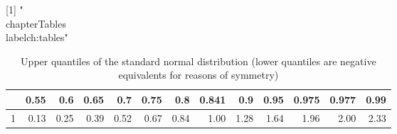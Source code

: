 [1] "\\chapter{Tables}\\label{ch:tables}"
\begin{table}[ht]
\centering
\begin{tabular}{rrrrrrrrrrrrr}
  \hline
 & 0.55 & 0.6 & 0.65 & 0.7 & 0.75 & 0.8 & 0.841 & 0.9 & 0.95 & 0.975 & 0.977 & 0.99 \\ 
  \hline
  1 & 0.13 & 0.25 & 0.39 & 0.52 & 0.67 & 0.84 & 1.00 & 1.28 & 1.64 & 1.96 & 2.00 & 2.33 \\ 
   \hline
\end{tabular}
\caption{Upper quantiles of the standard normal distribution (lower quantiles are negative equivalents for reasons of symmetry)} 
\end{table}
